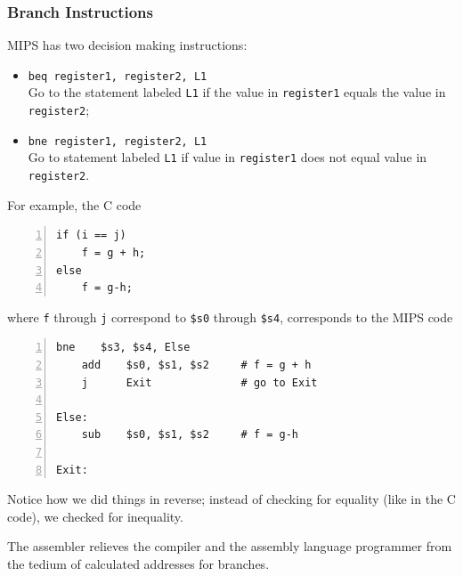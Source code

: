\documentclass[10pt]{article}
\begin{document}
  \subsubsection{Branch Instructions}
  MIPS has two decision making instructions:
  \begin{itemize}
  \item \texttt{beq register1, register2, L1}\\
    Go to the statement labeled \texttt{L1} if the value in \texttt{register1} equals the value in \texttt{register2};
  \item \texttt{bne register1, register2, L1}\\
    Go to statement labeled \texttt{L1} if value in \texttt{register1} does not equal value in \texttt{register2}. 
  \end{itemize}
  For example, the C code
\begin{lstlisting}[style=CStyle, numbers=left, xleftmargin=5.0ex, aboveskip=2em, belowskip=2em, numberstyle=\color{blue}, escapeinside=||]
if (i == j)
    f = g + h;
else
    f = g-h;
\end{lstlisting}
  where \texttt{f} through \texttt{j} correspond to \texttt{\$s0} through \texttt{\$s4}, corresponds to the MIPS code
\begin{lstlisting}[style=CStyle, numbers=left, xleftmargin=5.0ex, aboveskip=2em, belowskip=2em, numberstyle=\color{blue}, escapeinside=||]
    bne    $s3, $s4, Else
    add    $s0, $s1, $s2     # f = g + h
    j      Exit              # go to Exit

Else:
    sub    $s0, $s1, $s2     # f = g-h

Exit:
\end{lstlisting}
Notice how we did things in reverse; instead of checking for equality (like in the C code), we checked for inequality.
\begin{marginfigure}
The assembler relieves the compiler and the assembly language programmer from the tedium of calculated addresses for branches.
\end{marginfigure}%
\end{document}
